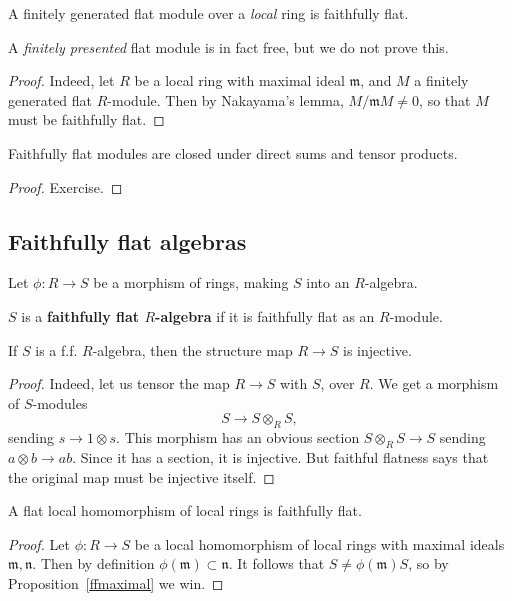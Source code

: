 \begin{corollary} 
A finitely generated flat module over a \emph{local} ring is faithfully flat.
\end{corollary} 

A \emph{finitely presented} flat module is in fact free, but we do not prove
this.
\begin{proof} 
Indeed, let $R$ be a local ring with maximal ideal $\mathfrak{m}$, and $M$ a
finitely generated flat $R$-module. Then by Nakayama's lemma, $M/\mathfrak{m}M
\neq 0$, so that $M$ must be faithfully flat.
\end{proof} 

\begin{proposition} 
Faithfully flat modules are closed under direct sums and tensor products.
\end{proposition} 

\begin{proof} 
Exercise.
\end{proof} 


\subsection{Faithfully flat algebras}

Let $\phi: R \to S$ be a morphism of rings, making $S$ into an $R$-algebra.

\begin{definition} 
$S$ is a \textbf{faithfully flat $R$-algebra} if it is faithfully flat as an
$R$-module.
\end{definition} 

\begin{proposition} 
If $S$ is a f.f. $R$-algebra, then the structure map $R \to S$ is injective.
\end{proposition} 
\begin{proof} 
Indeed, let us tensor the map $R \to S $ with $S$, over $R$. We get a morphism
of $S$-modules
\[ S \to S \otimes_R S ,  \]
sending $s \to  1 \otimes s$.
This morphism has an obvious section $S \otimes_R S \to S$ sending $a \otimes b
\to ab$. Since it has a section, it is injective. But faithful flatness says
that the original map must be injective itself.
\end{proof} 


\begin{proposition} 
A flat local homomorphism of local rings is faithfully flat.
\end{proposition} 
\begin{proof} 
Let $\phi: R \to S$ be a local homomorphism of local rings with maximal ideals
$\mathfrak{m}, \mathfrak{n}$. Then by definition $\phi(\mathfrak{m}) \subset
\mathfrak{n}$. It follows that $S \neq \phi(\mathfrak{m})S$, so by
Proposition~\ref{ffmaximal} we win.
\end{proof} 


